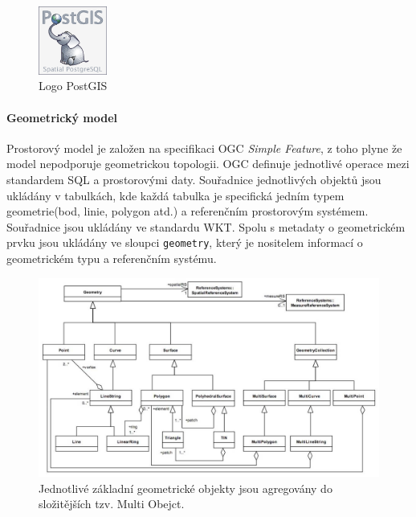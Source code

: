 \documentclass[a4paper,12pt]{report}
\begin{document}
  
\begin{figure}[h!]
    \centering
    \includegraphics[width=0.2\textwidth]{./img/implementace/postgis.png}
    \caption[Logo PostGIS]{\centering  Logo PostGIS \footnotemark}
 \end{figure}   

\paragraph*{Geometrický model} 
Prostorový model je založen na specifikaci \acs{OGC} \textit{Simple Feature}, z toho plyne že model nepodporuje geometrickou topologii. OGC definuje jednotlivé operace mezi standardem SQL a prostorovými daty. Souřadnice jednotlivých objektů jsou ukládány v tabulkách, kde každá tabulka je specifická jedním typem geometrie(bod, linie, polygon atd.) a referenčním prostorovým systémem. Souřadnice jsou ukládány ve standardu \acs{WKT}. Spolu s  metadaty o geometrickém prvku jsou ukládány ve sloupci \texttt{geometry}, který je  nositelem informací o geometrickém typu a referenčním systému.\cite{postgis}

\begin{figure}[h!]
    \centering
    \includegraphics[width=1\textwidth]{./img/implementace/ogc1.jpg}
    \caption[Model PostGIS]{\centering Jednotlivé základní geometrické objekty jsou agregovány do složitějších tzv. Multi Obejct.     \footnotemark}
 \end{figure}   
\end{document}
